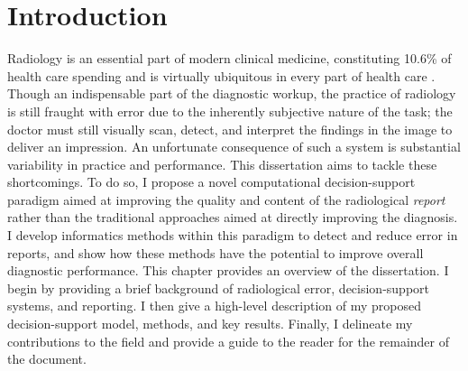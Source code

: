 \chapter{Introduction}
Radiology is an essential part of modern clinical medicine, constituting 10.6\% of health care spending and is virtually ubiquitous in every part of health care \cite{Dodoo:tg}.
Though an indispensable part of the diagnostic workup, the practice of radiology is still fraught with error due to the inherently subjective nature of the task; the doctor must still visually scan, detect, and interpret the findings in the image to deliver an impression. 
An unfortunate consequence of such a system is substantial variability in practice and performance. This dissertation aims to tackle these shortcomings. 
To do so, I propose a novel computational decision-support paradigm aimed at improving the quality and content of the radiological \emph{report} rather than the traditional approaches aimed at directly improving the diagnosis. 
I develop informatics methods within this paradigm to detect and reduce error in reports, and show how these methods have the potential to improve overall diagnostic performance. 
This chapter provides an overview of the dissertation. 
I begin by providing a brief background of radiological error, decision-support systems, and reporting. 
I then give a high-level description of my proposed decision-support model, methods, and key results. 
Finally, I delineate my contributions to the field and provide a guide to the reader for the remainder of the document.

